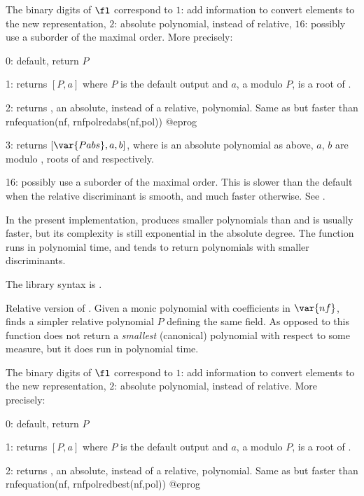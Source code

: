 The binary digits of $\fl$ correspond to $1$: add information to convert
elements to the new representation, $2$: absolute polynomial, instead of
relative, $16$: possibly use a suborder of the maximal order. More precisely:

0: default, return $P$

1: returns $[P,a]$ where $P$ is the default output and $a$,
a  modulo $P$, is a root of .

2: returns , an absolute, instead of a relative, polynomial.
Same as but faster than
\bprog
  rnfequation(nf, rnfpolredabs(nf,pol))
@eprog

3: returns $[\var{Pabs},a,b]$, where  is an absolute polynomial
as above, $a$, $b$ are  modulo , roots of 
and  respectively.

16: possibly use a suborder of the maximal order. This is slower than the
default when the relative discriminant is smooth, and much faster otherwise.
See .

 In the present implementation, 
produces smaller polynomials than  and is usually
faster, but its complexity is still exponential in the absolute degree.
The function  runs in polynomial time, and  tends  to
return polynomials with smaller discriminants.

The library syntax is .

\label{se:rnfpolredbest}
Relative version of . Given a monic polynomial 
with coefficients in $\var{nf}$, finds a simpler relative polynomial $P$
defining the same field. As opposed to  this function does
not return a \emph{smallest} (canonical) polynomial with respect to some
measure, but it does run in polynomial time.

The binary digits of $\fl$ correspond to $1$: add information to convert
elements to the new representation, $2$: absolute polynomial, instead of
relative. More precisely:

0: default, return $P$

1: returns $[P,a]$ where $P$ is the default output and $a$,
a  modulo $P$, is a root of .

2: returns , an absolute, instead of a relative, polynomial.
Same as but faster than
\bprog
  rnfequation(nf, rnfpolredbest(nf,pol))
@eprog

